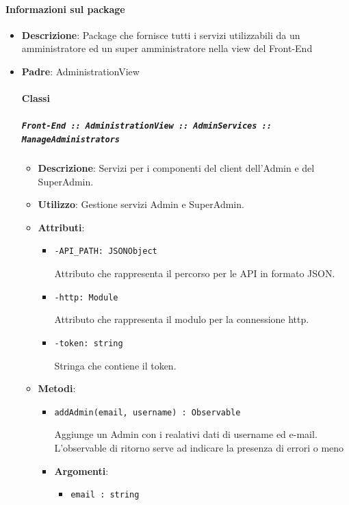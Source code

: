 \documentclass[../DefinizioneDiProdotto.tex]{subfiles}
\begin{document}
	\paragraph{Informazioni sul package}\begin{itemize}\item \textbf{Descrizione}: Package che fornisce tutti i servizi utilizzabili da un amministratore ed un super amministratore nella view del Front-End\item \textbf{Padre}: AdministrationView\paragraph{Classi}
	\subparagraph{\texttt{Front-End :: AdministrationView :: AdminServices :: ManageAdministrators}}
	\begin{itemize}\item \textbf{Descrizione}: Servizi per i componenti del client dell'Admin e del SuperAdmin.
	\item \textbf{Utilizzo}: Gestione servizi Admin e SuperAdmin.
	\item \textbf{Attributi}:
	\begin{itemize}
	\item \texttt{-API\_PATH: JSONObject}\

	 Attributo che rappresenta il percorso per le API in formato JSON.
	\end{itemize}
	\begin{itemize}
	\item \texttt{-http: Module}\

	 Attributo che rappresenta il modulo per la connessione http.
	\end{itemize}
	\begin{itemize}
	\item \texttt{-token: string}\

	 Stringa che contiene il token.
	\end{itemize}
	\item \textbf{Metodi}:
	\begin{itemize}
	\item \texttt{addAdmin(email, username) : Observable}\

	 Aggiunge un Admin con i realativi dati di username ed e-mail. L'observable di ritorno serve ad indicare la presenza di errori o meno

	\item \textbf{Argomenti}:
	\begin{itemize}
	\item \texttt{email : string}\


\end{itemize}
\end{itemize}
\end{itemize}
\end{itemize}
\end{document}
